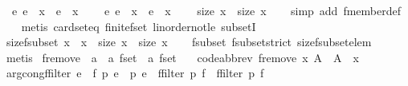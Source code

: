 \begin{isabellebody}
\ \ {\isachardoublequoteopen}{\isasymexists}e{\isachardot}\ e\ {\isacharbar}{\isasymin}{\isacharbar}\ x{}\ {\isasymand}\ e\ {\isacharbar}{\isasymnotin}{\isacharbar}\ x{}\ {\isasymLongrightarrow}\isanewline
\ \ \ {\isasymnexists}e{\isachardot}\ e\ {\isacharbar}{\isasymin}{\isacharbar}\ x{}\ {\isasymand}\ e\ {\isacharbar}{\isasymnotin}{\isacharbar}\ x{}\ {\isasymLongrightarrow}\isanewline
\ \ \ size\ x{}\ {\isacharless}\ size\ x{}{\isachardoublequoteclose}\isanewline
%
\isadelimproof
\ \ %
\endisadelimproof
%
\isatagproof
{}\isamarkupfalse%
\ {\isacharparenleft}simp\ add{\isacharcolon}\ fmember{\isacharunderscore}def{\isacharparenright}\isanewline
\ \ \isamarkupfalse%
\ {\isacharparenleft}metis\ card{\isacharunderscore}seteq\ finite{\isacharunderscore}fset\ linorder{\isacharunderscore}not{\isacharunderscore}le\ subsetI{\isacharparenright}%
\endisatagproof
{\isafoldproof}%
%
\isadelimproof
\isanewline
%
\endisadelimproof
\isanewline
{}\isamarkupfalse%
\ size{\isacharunderscore}fsubset{\isacharcolon}\ {\isachardoublequoteopen}x{}\ {\isacharbar}{\isasymsubset}{\isacharbar}\ x{}\ {\isasymLongrightarrow}\ size\ x{}\ {\isacharless}\ size\ x{}{\isachardoublequoteclose}\isanewline
%
\isadelimproof
\ \ %
\endisadelimproof
%
\isatagproof
{}\isamarkupfalse%
\ fsubset\ fsubset{\isacharunderscore}strict\ size{\isacharunderscore}fsubset{\isacharunderscore}elem\isanewline
\ \ \isamarkupfalse%
\ metis%
\endisatagproof
{\isafoldproof}%
%
\isadelimproof
\isanewline
%
\endisadelimproof
\isanewline
{}\isamarkupfalse%
\ fremove\ {\isacharcolon}{\isacharcolon}\ {\isachardoublequoteopen}{\isacharprime}a\ {\isasymRightarrow}\ {\isacharprime}a\ fset\ {\isasymRightarrow}\ {\isacharprime}a\ fset{\isachardoublequoteclose}\isanewline
\ \ \ {\isacharbrackleft}code{\isacharunderscore}abbrev{\isacharbrackright}{\isacharcolon}\ {\isachardoublequoteopen}fremove\ x\ A\ {\isacharequal}\ A\ {\isacharminus}\ {\isacharbraceleft}{\isacharbar}x{\isacharbar}{\isacharbraceright}{\isachardoublequoteclose}\isanewline
\isanewline
{}\isamarkupfalse%
\ arg{\isacharunderscore}cong{\isacharunderscore}ffilter{\isacharcolon}\ {\isachardoublequoteopen}{\isasymforall}e\ {\isacharbar}{\isasymin}{\isacharbar}\ f{\isachardot}\ p\ e\ {\isacharequal}\ p{\isacharprime}\ e\ {\isasymLongrightarrow}\ ffilter\ p\ f\ {\isacharequal}\ ffilter\ p{\isacharprime}\ f{\isachardoublequoteclose}\isanewline

\end{isabellebody}
